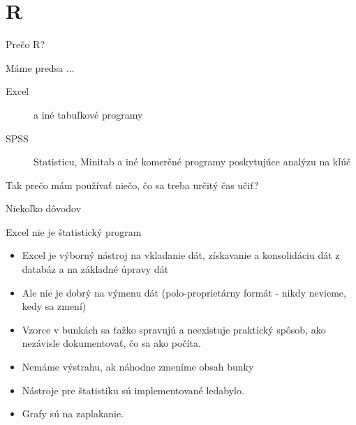 \section{R}
\begin{frame}{Prečo R?}
	\begin{block}{Máme predsa ...}
		\begin{description}
			\item[Excel] a iné tabuľkové programy
			\item[SPSS] Statisticu, Minitab a iné komerčné programy poskytujúce analýzu na kľúč
		\end{description}
		\alert{Tak prečo mám používať niečo, čo sa treba určitý čas učiť?}
	\end{block}
\end{frame}

\begin{frame}{Niekoľko dôvodov}
	\begin{block}{Excel nie je štatistický program}
		\begin{itemize}
			\item Excel je výborný nástroj na vkladanie dát, získavanie a konsolidáciu dát z databáz a na základné úpravy dát
			\item Ale nie je dobrý na výmenu dát (polo-proprietárny formát - nikdy nevieme, kedy sa zmení)
			\item Vzorce v bunkách sa ťažko spravujú a neexistuje praktický spôsob, ako nezávisle dokumentovať, čo sa ako počíta.
			\item Nemáme výstrahu, ak náhodne zmeníme obsah bunky
			\item Nástroje pre štatistiku sú implementované ledabylo.
			\item Grafy sú na zaplakanie.
		\end{itemize}
	\end{block}
\end{frame}

